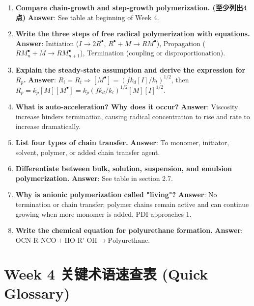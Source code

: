 \documentclass[12pt,a4paper]{ctexart}
\begin{document}
\begin{enumerate}
    \item \textbf{Compare chain-growth and step-growth polymerization. (至少列出4点)}  
    \textbf{Answer}: See table at beginning of Week 4.

    \item \textbf{Write the three steps of free radical polymerization with equations.}  
    \textbf{Answer}: Initiation ($I \rightarrow 2R^\bullet$, $R^\bullet + M \rightarrow RM^\bullet$), Propagation ($RM_n^\bullet + M \rightarrow RM_{n+1}^\bullet$), Termination (coupling or disproportionation).

    \item \textbf{Explain the steady-state assumption and derive the expression for $R_p$.}  
    \textbf{Answer}: $R_i = R_t \Rightarrow [M^\bullet] = (f k_d [I]/k_t)^{1/2}$, then $R_p = k_p [M] [M^\bullet] = k_p (f k_d/k_t)^{1/2} [M][I]^{1/2}$.

    \item \textbf{What is auto-acceleration? Why does it occur?}  
    \textbf{Answer}: Viscosity increase hinders termination, causing radical concentration to rise and rate to increase dramatically.

    \item \textbf{List four types of chain transfer.}  
    \textbf{Answer}: To monomer, initiator, solvent, polymer, or added chain transfer agent.

    \item \textbf{Differentiate between bulk, solution, suspension, and emulsion polymerization.}  
    \textbf{Answer}: See table in section 2.7.

    \item \textbf{Why is anionic polymerization called "living"?}  
    \textbf{Answer}: No termination or chain transfer; polymer chains remain active and can continue growing when more monomer is added. PDI approaches 1.

    \item \textbf{Write the chemical equation for polyurethane formation.}  
    \textbf{Answer}: $\text{OCN-R-NCO} + \text{HO-R'-OH} \rightarrow \text{Polyurethane}$.
\end{enumerate}

\section{Week 4 关键术语速查表 (Quick Glossary)}
\end{document}
